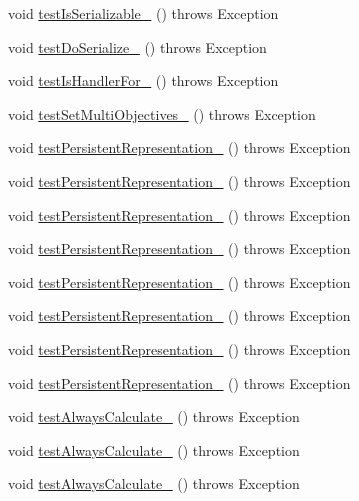 \begin{DoxyCompactItemize}
\item 
void \hyperlink{classorg_1_1jgap_1_1_chromosome_test_a754fd39a12bff54e1c6a320956b2e582}{test\-Is\-Serializable\-\_} ()  throws Exception 
\item 
void \hyperlink{classorg_1_1jgap_1_1_chromosome_test_acc3a5204d875825f43a8f75a981d59c3}{test\-Do\-Serialize\-\_} ()  throws Exception 
\item 
void \hyperlink{classorg_1_1jgap_1_1_chromosome_test_a32cb16cc2ddc2d6b6083206e7343a6e2}{test\-Is\-Handler\-For\-\_} ()  throws Exception 
\item 
void \hyperlink{classorg_1_1jgap_1_1_chromosome_test_a3d1e272c18c97803d4c899db511eea2f}{test\-Set\-Multi\-Objectives\-\_} ()  throws Exception 
\item 
void \hyperlink{classorg_1_1jgap_1_1_chromosome_test_a7acb7c4cadf33875acc90905e5337060}{test\-Persistent\-Representation\-\_} ()  throws Exception 
\item 
void \hyperlink{classorg_1_1jgap_1_1_chromosome_test_a1976aedf9f3800f1a5a0fc41800cc205}{test\-Persistent\-Representation\-\_} ()  throws Exception 
\item 
void \hyperlink{classorg_1_1jgap_1_1_chromosome_test_a72b7293c2f36685ad26a4bde4d4104ec}{test\-Persistent\-Representation\-\_} ()  throws Exception 
\item 
void \hyperlink{classorg_1_1jgap_1_1_chromosome_test_a305f438acdc6b2a71bed9914d65d7b9e}{test\-Persistent\-Representation\-\_} ()  throws Exception 
\item 
void \hyperlink{classorg_1_1jgap_1_1_chromosome_test_a2ce588805b6ec5032fc306dff0b8f3db}{test\-Persistent\-Representation\-\_} ()  throws Exception 
\item 
void \hyperlink{classorg_1_1jgap_1_1_chromosome_test_aeb2d6321d40bfc90403b587dc2f394bc}{test\-Persistent\-Representation\-\_} ()  throws Exception 
\item 
void \hyperlink{classorg_1_1jgap_1_1_chromosome_test_aab67d18b92a7eba71533592b282c1469}{test\-Persistent\-Representation\-\_} ()  throws Exception 
\item 
void \hyperlink{classorg_1_1jgap_1_1_chromosome_test_a4d968b5e0064d46c6b1d7ce9a6ea50ab}{test\-Persistent\-Representation\-\_} ()  throws Exception 
\item 
void \hyperlink{classorg_1_1jgap_1_1_chromosome_test_a84dc7e0f769f5aca021188141e03f5b1}{test\-Always\-Calculate\-\_} ()  throws Exception 
\item 
void \hyperlink{classorg_1_1jgap_1_1_chromosome_test_a795ef8a14f315269755b8099d87d37ab}{test\-Always\-Calculate\-\_} ()  throws Exception 
\item 
void \hyperlink{classorg_1_1jgap_1_1_chromosome_test_ac2e1cd4c7c34eae45c805aeb8302eb62}{test\-Always\-Calculate\-\_} ()  throws Exception 
\end{DoxyCompactItemize}
